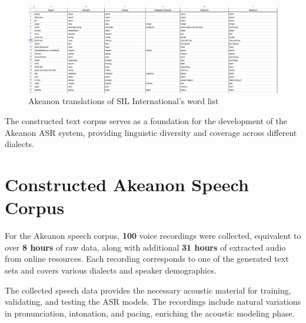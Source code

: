 \begin{figure}[H]
    \centering
    \includegraphics[width=\textwidth]{./figures/SIL.png}
    \caption{Akeanon translations of SIL International's word list}
    \label{fig:sil-list}
\end{figure}

The constructed text corpus serves as a foundation for the development of the Akeanon ASR system, providing linguistic diversity and coverage across different dialects.

\section{Constructed Akeanon Speech Corpus}

For the Akeanon speech corpus, \textbf{100} voice recordings were collected, equivalent to over \textbf{8 hours} of raw data, along with additional \textbf{31 hours} of extracted audio from online resources. Each recording corresponds to one of the generated text sets and covers various dialects and speaker demographics.

The collected speech data provides the necessary acoustic material for training, validating, and testing the ASR models. The recordings include natural variations in pronunciation, intonation, and pacing, enriching the acoustic modeling phase.

